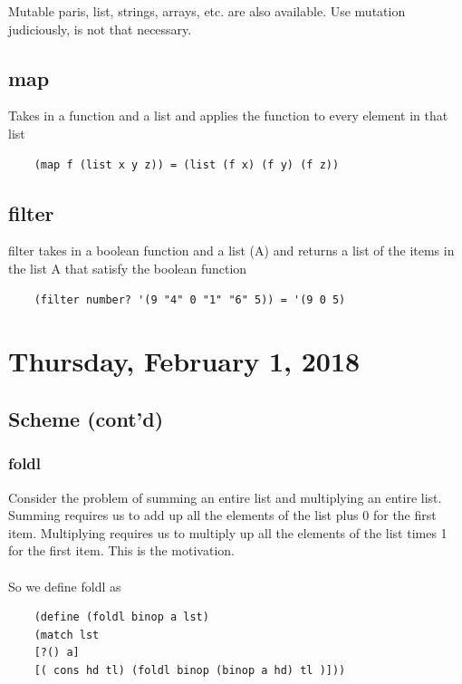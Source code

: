 \documentclass[12pt]{article}
\begin{document}
Mutable paris, list, strings, arrays, etc. are also available. Use mutation judiciously, is not that necessary.

\subsection{map}

Takes in a function and a list and applies the function to every element in that list

\begin{lstlisting}
	(map f (list x y z)) = (list (f x) (f y) (f z))
\end{lstlisting}

\subsection{filter}

filter takes in a boolean function and a list (A) and returns a list of the items in the list A that satisfy the boolean function

\begin{lstlisting}
	(filter number? '(9 "4" 0 "1" "6" 5)) = '(9 0 5)
\end{lstlisting}


\newpage

\section{Thursday, February 1, 2018}

\subsection{Scheme (cont'd)}

\subsubsection{foldl}

Consider the problem of summing an entire list and multiplying an entire list. Summing requires us to add up all the elements of the list plus 0 for the first item. Multiplying requires us to multiply up all the elements of the list times 1 for the first item. This is the motivation.\\
\\
So we define foldl as

\begin{lstlisting}
    (define (foldl binop a lst)
	(match lst
	[?() a]
	[( cons hd tl) (foldl binop (binop a hd) tl )]))
\end{lstlisting}
\end{document}

